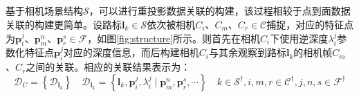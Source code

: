 \subsection{}
\label{subsubsec:reproject}
基于相机场景结构$\mathcal{S}$，可以进行重投影数据关联的构建，该过程相较于点到面数据关联的构建更简单。设路标$\boldsymbol{l}_k\in\mathcal{S}$依次被相机$C_i$、$C_m$、$C_r\in\mathcal{C}$捕捉，对应的特征点为$\boldsymbol{p}_i^j$、$\boldsymbol{p}_m^n$、$\boldsymbol{p}_r^s\in\mathcal{F}$，如图\ref{fig:structure}所示。则首先在相机$C_i$下使用逆深度$\lambda_i^j$参数化特征点$\boldsymbol{p}_i^j$对应的深度信息，而后构建相机$C_i$与其余观察到路标$\boldsymbol{l}_k$的相机帧$C_m$、$C_r$之间的关联。相应的关联结果表示为：
\begin{equation}
  \mathcal{D}_{C}=\left\lbrace\mathcal{D}_{\boldsymbol{l}_k} \right\rbrace \quad\mathcal{D}_{\boldsymbol{l}_k}=\left\lbrace \boldsymbol{l}_k,\boldsymbol{p}_i^j,\lambda_i^j\mid\boldsymbol{p}_m^n,\boldsymbol{p}_r^s,\cdots\right\rbrace \quad k\in\mathcal{S}^\dagger,i,m,r\in\mathcal{C}^\dagger,j,n,s\in\mathcal{F}^\dagger
\end{equation}

